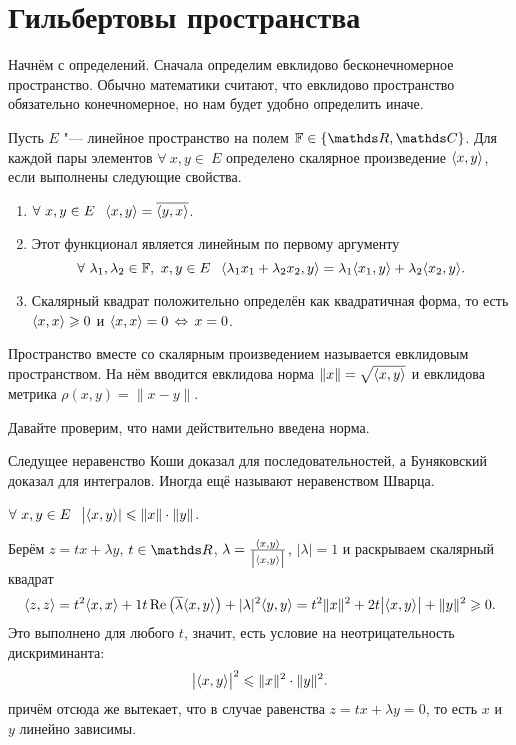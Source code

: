 \section{Гильбертовы пространства}
Начнём с определений. Сначала определим евклидово бесконечномерное пространство. Обычно математики считают, что евклидово пространство обязательно конечномерное, но нам будет удобно определить иначе.

\begin{Def}
  Пусть $E$ "--- линейное пространство на полем $\F\in\{\R,\C\}$. Для каждой пары элементов $\forall\ x,y\in\ E$ определено скалярное произведение $\langle x,y\rangle $, если выполнены следующие свойства.
\begin{enumerate}
  \item $\forall\ x,y\in E\pau \la x,y\ra  = \ol{\la y,x\ra }$.

  \item Этот функционал является линейным по первому аргументу
  \[
     \forall\ \lambda_1,\lambda_2\in\mathbb F,\ x,y\in E\hskip .75em plus.1em minus.08em\relax \langle \lambda_1 x_1 + \lambda_2 x_2,y\rangle  = \lambda_1 \langle x_1,y\rangle  + \lambda_2 \langle x_2,y\rangle .
  \]
  \item Скалярный квадрат положительно определён как квадратичная форма, то есть $\langle x,x\rangle \geqslant 0$ и $\langle x,x\rangle =0\,\Leftrightarrow\, x=0$.
\end{enumerate}
Пространство вместе со скалярным произведением называется евклидовым пространством. На нём вводится евклидова норма $\|x\| = \sqrt{\langle x,y\rangle }$ и евклидова метрика $\rho(x,y) = \|x-y\|$.
\end{Def}

Давайте проверим, что нами действительно введена норма.

Следущее неравенство Коши доказал для последовательностей, а Буняковский доказал для интегралов. Иногда ещё называют неравенством Шварца.
\begin{Ut}
  $\forall\ x,y\in E\pau \big|\la x,y\ra |\le \|x\|\cdot \|y\|$.
\end{Ut}
\begin{Proof}
 Берём $z = tx + \lambda y$, $t\in \R$, $\lambda = \frac{\langle x,y\rangle }{\big|\langle x,y\rangle \big|}$, $|\lambda|=1$ и раскрываем скалярный квадрат
\[
  \langle z,z\rangle  = t^2\langle x,x\rangle  + 1 t \mathop{\text{Re}}\big(\overline{\lambda}\langle x,y\rangle \big) + |\lambda|^2\langle y,y\rangle  =
  t^2\|x\|^2 + 2t\big|\langle x,y\rangle \big|+\|y\|^2\geqslant 0.
\]
Это выполнено для любого $t$, значит, есть условие на неотрицательность дискриминанта:
\[
  \big|\langle x,y\rangle \big|^2\leqslant \|x\|^2\cdot \|y\|^2.
\]
причём отсюда же вытекает, что в случае равенства $z = tx+\lambda y=0$, то есть $x$ и $y$ линейно зависимы.
\end{Proof}

